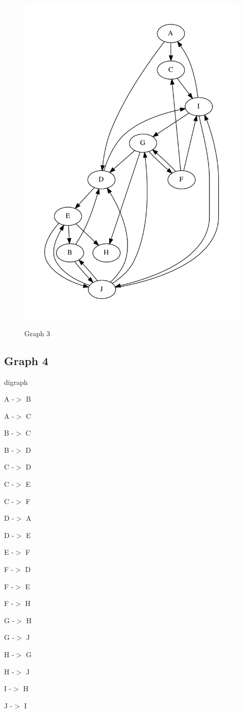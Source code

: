 \documentclass{article}
\begin{document}
\begin{figure}
\centering
\includegraphics[scale=0.4]{g3.pdf}
\label{Figure 1: }
\caption{Graph 3}
\end{figure}

\subsection{Graph 4}
digraph {

A -$>$ B

A -$>$ C

B -$>$ C

B -$>$ D

C -$>$ D

C -$>$ E

C -$>$ F

D -$>$ A

D -$>$ E

E -$>$ F

F -$>$ D

F -$>$ E

F -$>$ H

G -$>$ H

G -$>$ J

H -$>$ G

H -$>$ J

I -$>$ H

J -$>$ I

}
\end{document}
